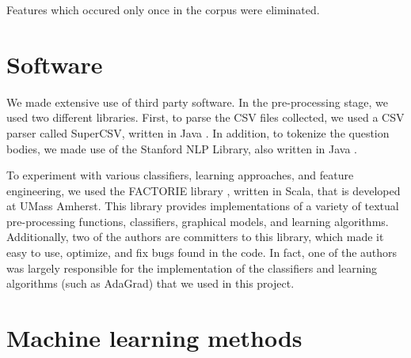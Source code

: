 \documentclass[11pt]{article}
\begin{document}
Features which occured only once in the corpus were eliminated.

\section{Software}

We made extensive use of third party software. In the pre-processing stage, we
used two different libraries.  First, to parse the CSV files
collected, we used a CSV parser called SuperCSV, written in Java
\cite{website:supercsv}. In addition, to tokenize the question bodies,
we made use of the Stanford NLP Library, also written in Java
\cite{stanfordnlp}.

To experiment with various classifiers, learning approaches, and feature engineering, we used the
FACTORIE library \cite{mccallum09:factorie:}, written in Scala, that is developed at UMass Amherst.  This library provides implementations of a variety of textual pre-processing functions, classifiers, graphical models, and learning algorithms. Additionally, two of the authors are committers to this library, which made it easy to use, optimize, and fix bugs found in the code. In fact, one of the authors was largely responsible for the implementation of the classifiers and learning algorithms (such as AdaGrad) that we used in this project.

\section{Machine learning methods}
\end{document}
